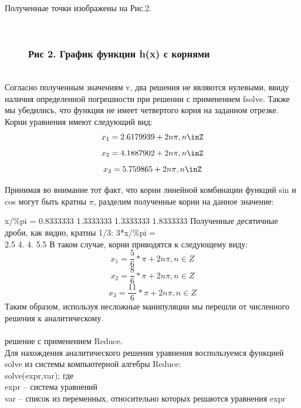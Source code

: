 \documentclass[russian,utf8,nocolumnxxxi,nocolumnxxxii]{eskdtext}
\begin{document}
Полученные точки изображены на Рис.2.
\begin{figure}[H]
\begin{center}
\begin{minipage}[h]{0.65\linewidth}
  \\
\frametitle{Рис 2. График функции h(x) с корнями}
\end{minipage}
\end{center}
\end{figure}
\\
Согласно полученным значениям v, два решения не являются нулевыми, ввиду наличия определенной погрешности при решении с применением  fsolve. Также мы убедились, что функция не имеет четвертого корня на заданном отрезке.\\

Корни уравнения имеют следующий вид:\\
$$x_1=2.6179939+2n\pi,n\inZ$$
$$x_2=4.1887902+2n\pi,n\inZ$$
$$x_3=5.759865+2n\pi,n\inZ$$

Принимая во внимание тот факт, что корни линейной комбинации функций sin и cos могут быть кратны $\pi$, разделим полученные корни на данное значение:

x/\%pi =
0.8333333 1.3333333 1.3333333 1.8333333
Полученные десятичные дроби, как видно, кратны 1/3:
3*x/\%pi =
\\2.5 4. 4. 5.5
\newpage
В таком случае, корни приводятся к следующему виду:
$$x_1=\frac{5}{6}*\pi+2n\pi,n\in Z$$
$$x_2=\frac{8}{6}*\pi+2n\pi,n\in Z$$
$$x_3=\frac{11}{6}*\pi+2n\pi,n\in Z$$
Таким образом, используя несложные манипуляции мы перешли от численного решения к аналитическому.\\
\\
{ решение с применением Reduce.}\\
Для нахождения аналитического решения уравнения воспользуемся функцией solve из системы компьютерной алгебры Reduce:\\
solve(expr,var); где\\
expr – система уравнений\\
var – список из переменных, относительно которых решаются уравнения expr\\
\end{document}

